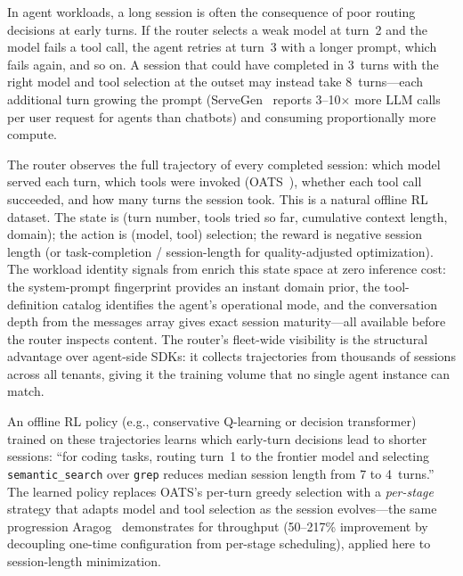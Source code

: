 \begin{opportunity}
\label{opp:session-cascade}
In agent workloads, a long session is often the consequence of poor
routing decisions at early turns.  If the router selects a weak
model at turn~2 and the model fails a tool call, the agent retries
at turn~3 with a longer prompt, which fails again, and so on.  A
session that could have completed in 3~turns with the right model
and tool selection at the outset may instead take 8~turns---each
additional turn growing the prompt
(ServeGen~\cite{servegen2025} reports 3--10$\times$ more LLM calls
per user request for agents than chatbots) and consuming
proportionally more compute.

The router observes the full trajectory of every completed session:
which model served each turn, which tools were invoked
(OATS~\cite{oats2026}), whether each tool call succeeded, and how
many turns the session took.  This is a natural offline RL dataset.
The state is (turn number, tools tried so far, cumulative context
length, domain); the action is (model, tool) selection; the reward
is negative session length (or task-completion / session-length for
quality-adjusted optimization).  The workload identity signals from
 enrich this state space at zero
inference cost: the system-prompt fingerprint provides an instant
domain prior, the tool-definition catalog identifies the agent's
operational mode, and the conversation depth from the messages
array gives exact session maturity---all available before the
router inspects content.  The router's fleet-wide visibility
is the structural advantage over agent-side SDKs: it collects
trajectories from thousands of sessions across all tenants, giving
it the training volume that no single agent instance can match.

An offline RL policy (e.g., conservative Q-learning or decision
transformer) trained on these trajectories learns which early-turn
decisions lead to shorter sessions: ``for coding tasks, routing
turn~1 to the frontier model and selecting \texttt{semantic\_search}
over \texttt{grep} reduces median session length from 7 to
4~turns.''  The learned policy replaces OATS's per-turn greedy
selection with a \emph{per-stage} strategy that adapts model and
tool selection as the session evolves---the same progression
Aragog~\cite{aragog2025} demonstrates for throughput (50--217\%
improvement by decoupling one-time configuration from per-stage
scheduling), applied here to session-length minimization.


\end{opportunity}
